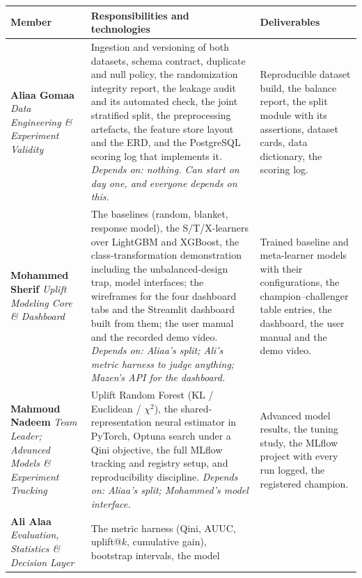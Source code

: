 \documentclass[11pt,a4paper]{article}
\begin{document}
\begin{longtable}{@{}L{3.1cm}L{6.0cm}L{5.0cm}@{}}
\toprule
\textbf{Member} & \textbf{Responsibilities and technologies} & \textbf{Deliverables} \\
\midrule
\endhead
\textbf{Aliaa Gomaa} \newline \emph{Data Engineering \& Experiment Validity} &
Ingestion and versioning of both datasets, schema contract, duplicate and null policy, the
randomization integrity report, the leakage audit and its automated check, the joint stratified
split, the preprocessing artefacts, the feature store layout and the ERD, and the PostgreSQL
scoring log that implements it.
\newline \emph{Depends on: nothing. Can start on day one, and everyone depends on this.} &
Reproducible dataset build, the balance report, the split module with its assertions, dataset
cards, data dictionary, the scoring log. \\
\addlinespace
\textbf{Mohammed Sherif} \newline \emph{Uplift Modeling Core \& Dashboard} &
The baselines (random, blanket, response model), the S/T/X-learners over LightGBM and XGBoost,
the class-transformation demonstration including the unbalanced-design trap, model interfaces;
the wireframes for the four dashboard tabs and the Streamlit dashboard built from them; the user
manual and the recorded demo video.
\newline \emph{Depends on: Aliaa's split; Ali's metric harness to judge anything; Mazen's API for
the dashboard.} &
Trained baseline and meta-learner models with their configurations, the champion--challenger
table entries, the dashboard, the user manual and the demo video. \\
\addlinespace
\textbf{Mahmoud Nadeem} \newline \emph{Team Leader; Advanced Models \& Experiment Tracking} &
Uplift Random Forest (KL / Euclidean / $\chi^2$), the shared-representation neural estimator in
PyTorch, Optuna search under a Qini objective, the full MLflow tracking and registry setup, and
reproducibility discipline.
\newline \emph{Depends on: Aliaa's split; Mohammed's model interface.} &
Advanced model results, the tuning study, the MLflow project with every run logged, the registered
champion. \\
\addlinespace
\textbf{Ali Alaa} \newline \emph{Evaluation, Statistics \& Decision Layer} &
The metric harness (Qini, AUUC, uplift@$k$, cumulative gain), bootstrap intervals, the model

\end{longtable}
\end{document}
